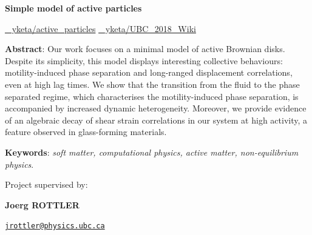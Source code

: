 \documentclass[class=report, float=false, crop=false]{standalone}
\begin{document}
\begin{center}


\vspace{1.5cm}

\textbf{\Huge Simple model of active particles}
\vspace{0.3cm}
\begin{center}
\begin{minipage}{0.7\linewidth}
\href{https://github.com/yketa/active_particles}{{\large \faGithub~ yketa/active\_particles}}
\hfill\href{https://github.com/yketa/UBC_2018_Wiki}{{\large \faGithub~ yketa/UBC\_2018\_Wiki}}
\end{minipage}
\end{center}


\vspace{1cm}

\parbox{15cm}{\small
\textbf{Abstract}: Our work focuses on a minimal model of active Brownian disks. Despite its simplicity, this model displays interesting collective behaviours: motility-induced phase separation and long-ranged displacement correlations, even at high lag times. We show that the transition from the fluid to the phase separated regime, which characterises the motility-induced phase separation, is accompanied by increased dynamic heterogeneity. Moreover, we provide evidence of an algebraic decay of shear strain correlations in our system at high activity, a feature observed in glass-forming materials.
}

\vspace{0.5cm}
\parbox{15cm}{
\textbf{Keywords}: {\it soft matter, computational physics, active matter, non-equilibrium physics}.
}

\vspace{0.5cm}


\parbox{15cm}{

\begin{center}

{\small Project supervised by:}

\vspace{0.4cm}

\begin{minipage}{0.5\textwidth}
\centering

{\bf Joerg ROTTLER}

\href{mailto:jrottler@physics.ubc.ca}{\tt jrottler@physics.ubc.ca} \\


\end{minipage}
\end{center}}
\end{center}
\end{document}
